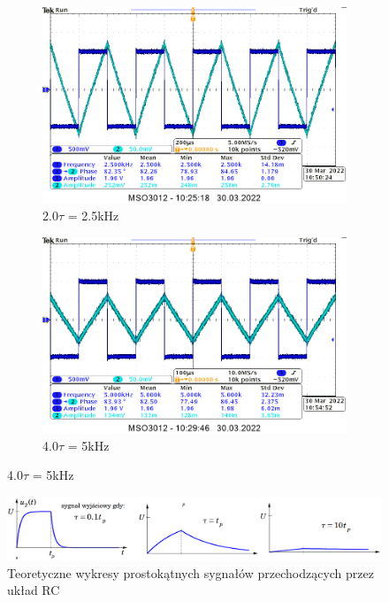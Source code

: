 \begin{figure}[H]
    \centering
    \begin{subfigure}[h]{0.45\textwidth}
        \includegraphics[width=\textwidth]{img_osciloscope/RC_pros/RC_prostokat_2_0_tau_cropped.png}
        \caption*{2.0$\tau$ = 2.5kHz}
    \end{subfigure}
    \begin{subfigure}[h]{0.45\textwidth}
        \includegraphics[width=\textwidth]{img_osciloscope/RC_pros/RC_prostokat_4_0_tau_cropped.png}
        \caption*{4.0$\tau$ = 5kHz}
    \end{subfigure}
\end{figure}

\begin{figure}[H]
    \centering
    \includegraphics[width=\textwidth]{img_wyklad/teor_pros_RC.png}
    \caption{Teoretyczne wykresy prostokątnych sygnałów przechodzących przez układ RC}
    \label{fig:my_label}
\end{figure}

